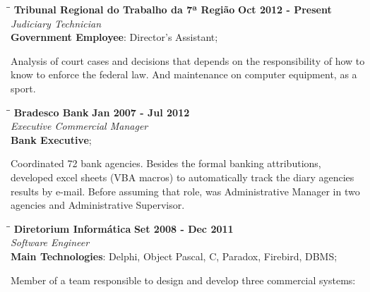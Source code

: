 \documentclass[margin]{res}
\begin{document}
\begin{resume}
   \begin{tabbing}
   \hspace{2.3in}\= \hspace{1.7in}\= \kill %
    \textbf{Tribunal Regional do Trabalho da 7ª Região}    \>\>\textbf{Oct 2012 - Present}\\
    \textit{Judiciary Technician}\\
    \textbf{Government Employee}: Director's Assistant;
   \end{tabbing}\vspace{-20pt}      %
    \vspace{2mm}
    Analysis of court cases and decisions that depends on the responsibility of how to know to enforce the federal law.
    And maintenance on computer equipment, as a sport.

   \begin{tabbing}
   \hspace{2.3in}\= \hspace{1.7in}\= \kill %
    \textbf{Bradesco Bank}    \>\>\textbf{Jan 2007 - Jul 2012}\\
    \textit{Executive Commercial Manager}\\
    \textbf{Bank Executive};
   \end{tabbing}\vspace{-20pt}      %
    \vspace{2mm}
    Coordinated 72 bank agencies. Besides the formal banking attributions, developed excel sheets (VBA macros) to automatically track
    the diary agencies results by e-mail. Before assuming that role, was Administrative Manager in two agencies and Administrative
    Supervisor.

   \begin{tabbing}
   \hspace{2.3in}\= \hspace{1.7in}\= \kill %
    \textbf{Diretorium Informática}    \>\>\textbf{Set 2008 - Dec 2011}\\
    \textit{Software Engineer}\\
    \textbf{Main Technologies}: Delphi, Object Pascal, C, Paradox, Firebird, DBMS;
   \end{tabbing}\vspace{-20pt}      %
    \vspace{2mm}

    Member of a team responsible to design and develop three commercial systems:


\end{resume}
\end{document}
